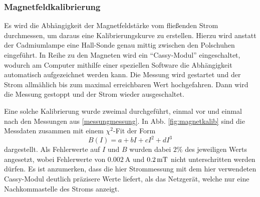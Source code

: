 \documentclass{article}
\begin{document}
\begin{multicols}{2}
\subsubsection{Magnetfeldkalibrierung}
Es wird die Abhängigkeit der Magnetfeldstärke vom fließenden Strom durchmessen, um daraus eine Kalibrierungskurve zu erstellen.
Hierzu wird anstatt der Cadmiumlampe eine Hall-Sonde genau mittig zwischen den Polschuhen eingeführt.
In Reihe zu den Magneten wird ein \enquote{Cassy-Modul} eingeschaltet,
wodurch am Computer mithilfe einer speziellen Software die Abhängigkeit automatisch aufgezeichnet werden kann.
Die Messung wird gestartet und der Strom allmählich bis zum maximal erreichbaren Wert hochgefahren.
Dann wird die Messung gestoppt und der Strom wieder ausgeschaltet.

Eine solche Kalibrierung wurde zweimal durchgeführt, einmal vor und einmal nach den Messungen aus \ref{messungmessung}.
In Abb. \ref{fig:magnetkalib} sind die Messdaten zusammen mit einem $\chi^2$-Fit der Form
\[
  B(I) = a + bI + cI^2 + dI^3
\]
dargestellt. Als Fehlerwerte auf $I$ und $B$ wurden dabei $2\%$ des jeweiligen Werts angesetzt,
wobei Fehlerwerte von $\SI{0.002}{\A}$ und $\SI{0.2}{\mT}$ nicht unterschritten werden dürfen.
Es ist anzumerken, dass die hier Strommessung mit dem hier verwendeten Cassy-Modul deutlich präzisere Werte liefert,
als das Netzgerät, welche nur eine Nachkommastelle des Stroms anzeigt.


\end{multicols}
\end{document}
